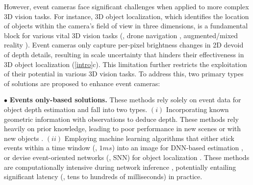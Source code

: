 However, event cameras face significant challenges when applied to more complex 3D vision tasks.
For instance, 3D object localization, which identifies the location of objects within the camera's field of view in three dimensions, is a fundamental block for various vital 3D vision tasks (\eg, drone navigation \cite{wang2022micnest}, augmented/mixed reality \cite{xu2021followupar}).
Event cameras only capture per-pixel brightness changes in 2D devoid of depth details, resulting in scale uncertainty that hinders their effectiveness in 3D object localization (\fig \ref{intro}c).
This limitation further restricts the exploitation of their potential in various 3D vision tasks.
To address this, two primary types of solutions are proposed to enhance event cameras:



\noindent $\bullet$ \textbf{Events only-based solutions.}
These methods rely solely on event data for object depth estimation and fall into two types. 
$(i)$ Incorporating known geometric information with observations to deduce depth. 
These methods rely heavily on prior knowledge, leading to poor performance in new scenes or with new objects \cite{falanga2020dynamic}.
$(ii)$ Employing machine learning algorithms that either stick events within a time window (\eg, $1ms$) into an image for DNN-based estimation \cite{guo2022low}, or devise event-oriented networks (\eg, SNN) for object localization \cite{zhou2023computational, barchid2023spiking}. 
These methods are computationally intensive during network inference \cite{diehl2015unsupervised, guo2021toward}, potentially entailing significant latency (\eg, tens to hundreds of milliseconds) in practice.

